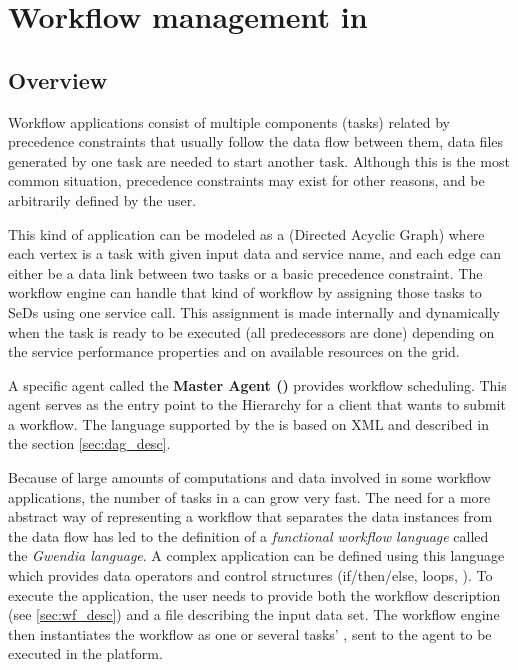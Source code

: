 
\chapter{Workflow management in \textsc{\diet}}
\label{ch:workflows}

\section{Overview}

Workflow applications consist of multiple components (tasks) related by
precedence constraints that usually follow the data flow between
them, \ie data files generated by one task are needed to start another
task. Although this is the most common situation, precedence constraints
may exist for other reasons, and be arbitrarily defined by the user.

This kind of application can be modeled as a \DAG (Directed Acyclic Graph) where
each vertex is a task with given input data and service name, and each edge can
either be a data link between two tasks or a basic precedence constraint. The
\diet workflow engine can handle that kind of workflow by assigning 
those tasks to SeDs using one \diet service call. This assignment is
made internally and dynamically when the task is ready to be executed (\ie all predecessors
are done) depending on the service performance properties and on available
resources on the grid.

A specific agent called the \textbf{Master Agent \DAG (\madag)} provides \DAG
workflow scheduling. This agent serves as the entry point to the \diet
Hierarchy for a client that wants to submit a workflow. The language
supported by the \madag is based on XML and described in
the section \ref{sec:dag_desc}.

Because of large amounts of computations and data involved in some workflow
applications, the number of tasks in a \DAG can grow very fast. The need for a
more abstract way of representing a workflow that separates the data instances
from the data flow has led to the definition of a {\it functional workflow
language} called the \textit{Gwendia language}. A complex application can be
defined using this language which provides data operators and control structures
(if/then/else, loops, \etc). To execute the application, the user needs to provide both
the workflow description (see \ref{sec:wf_desc}) and a file describing the
input data set. The \diet workflow engine then instantiates the workflow as one
or several tasks' \DAGS, sent to the \madag agent to be executed in the
\diet platform.

